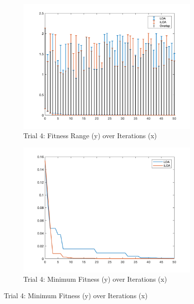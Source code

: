 \begin{figure}
  \begin{subfigure}[b]{0.4\textwidth}
    \includegraphics[width=\textwidth]{img/bars/f5/4}
    \caption{ \scriptsize Trial 4: Fitness Range (y) over Iterations (x)}
    \label{fig:f5-b-4}
  \end{subfigure}
  \begin{subfigure}[b]{0.4\textwidth}
    \includegraphics[width=\textwidth]{img/fits/f5/4}
    \caption{ \scriptsize Trial 4: Minimum Fitness (y) over Iterations (x)}
    \label{fig:f5-f-4}
  \end{subfigure}


\end{figure}
